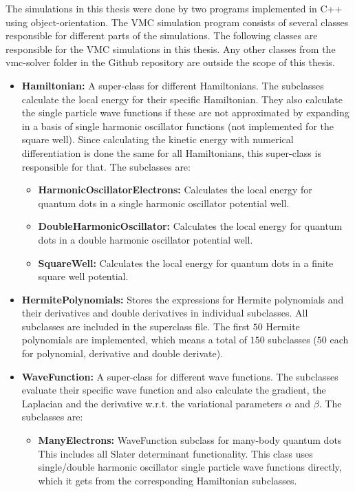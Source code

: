 \documentclass[../main.tex]{subfiles}
\begin{document}
\begin{appendices}
The simulations in this thesis were done by two programs implemented in C++ using object-orientation. 
The VMC simulation program consists of several classes responsible for different parts of the simulations. The following classes are responsible for the VMC simulations in this thesis. Any other classes from the vmc-solver folder in the Github repository \cite{github} are outside the scope of this thesis.
\begin{itemize}
    \item {\bf Hamiltonian:} A super-class for different Hamiltonians. The subclasses calculate the local energy for their specific Hamiltonian. They also calculate the single particle wave functions if these are not approximated by expanding in a basis of single harmonic oscillator functions (not implemented for the square well). Since calculating the kinetic energy with numerical differentiation is done the same for all Hamiltonians, this super-class is responsible for that. The subclasses are:
    \begin{itemize}
        \item \textbf{HarmonicOscillatorElectrons:} Calculates the local energy for quantum dots in a single harmonic oscillator potential well.
        \item \textbf{DoubleHarmonicOscillator:} Calculates the local energy for quantum dots in a double harmonic oscillator potential well.
        \item \textbf{SquareWell:} Calculates the local energy for quantum dots in a finite square well potential.
    \end{itemize}
    \item \textbf{HermitePolynomials:} Stores the expressions for Hermite polynomials and their derivatives and double derivatives in individual subclasses. All subclasses are included in the superclass file. The first $50$ Hermite polynomials are implemented, which means a total of $150$ subclasses ($50$ each for polynomial, derivative and double derivate).
    \item {\bf WaveFunction:} A super-class for different wave functions. The subclasses evaluate their specific wave function and also calculate the gradient, the Laplacian and the derivative w.r.t. the variational parameters $\alpha$ and $\beta$. The subclasses are:
    \begin{itemize}
        \item \textbf{ManyElectrons:} WaveFunction subclass for many-body quantum dots This includes all Slater determinant functionality. This class uses single/double harmonic oscillator single particle wave functions directly, which it gets from the corresponding Hamiltonian subclasses.

\end{itemize}
\end{itemize}
\end{appendices}
\end{document}
